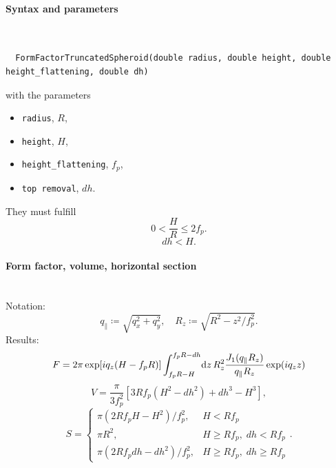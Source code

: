 \paragraph{Syntax and parameters}\strut\\[-2ex plus .2ex minus .2ex]
\begin{lstlisting}
  FormFactorTruncatedSpheroid(double radius, double height, double height_flattening, double dh)
\end{lstlisting}
with the parameters
\begin{itemize}
\item \texttt{radius}, $R$,
\item \texttt{height}, $H$,
\item \texttt{height\_flattening}, $f_p$,
\item \texttt{top removal}, $dh$.
\end{itemize}
They must fulfill
\begin{equation*}
  0< \dfrac{H}{R}\le 2f_p.
\end{equation*}
\begin{equation*}
  dh < H.
\end{equation*}

\paragraph{Form factor, volume, horizontal section}\strut\\
Notation:
\begin{equation*}
  q_{\parallel} \coloneqq \sqrt{q_x^2+q_y^2}, \quad
  R_z \coloneqq \sqrt{R^2-z^2/f_p^2}.
\end{equation*}
Results:
\begin{equation*}
F =   2\pi \exp[iq_z(H-f_pR)] \int_{f_p R-H}^{f_p R-dh} \!\mathrm d z\,
     R_z^2\frac{J_1(q_{\parallel}R_z)}{q_{\parallel}R_z} \exp(i q_z z)
\end{equation*}
\begin{equation*}
  V=\frac{\pi}{3f_p^2} \left[ 3R f_p\left(H^2-dh^2\right) +dh^3 - H^3 \right],
\end{equation*}
\begin{equation*}
  S = \left\{\begin{array}{ll} \pi\left(2Rf_pH-H^2\right)/f_p^2, & H < Rf_p \\
                               \pi R^2, & H \geq Rf_p,\; dh < Rf_p \\
                               \pi\left(2Rf_pdh-dh^2\right)/f_p^2, & H \geq Rf_p,\; dh \geq Rf_p
                                 \end{array}\right..
\end{equation*}

